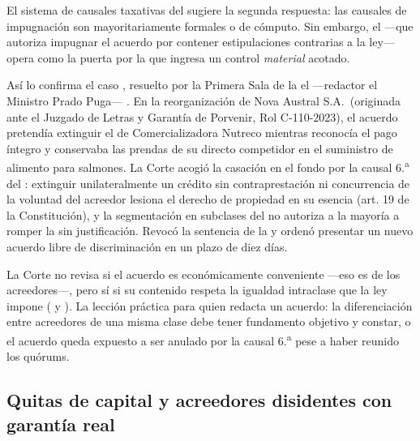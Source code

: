 El sistema de causales taxativas del  sugiere la segunda respuesta: las causales de
impugnación son mayoritariamente formales o de cómputo. Sin embargo, el 
---que autoriza impugnar el acuerdo por contener estipulaciones contrarias a la ley--- opera como
la puerta por la que ingresa un control \emph{material} acotado.

Así lo confirma el caso , resuelto por la Primera
Sala de la \csup{} el  ---redactor el Ministro Prado Puga---
\parencite{juris-cs-nova-austral}. En la reorganización de Nova Austral S.A.\ (originada ante el
Juzgado de Letras y Garantía de Porvenir, Rol C-110-2023), el acuerdo pretendía extinguir el
 de Comercializadora Nutreco mientras reconocía el
pago íntegro y conservaba las prendas de su directo competidor en el suministro de alimento para
salmones. La Corte acogió la casación en el fondo por la causal 6.\textsuperscript{a} del :
extinguir unilateralmente un crédito sin contraprestación ni concurrencia de la voluntad del
acreedor lesiona el derecho de propiedad en su esencia (art. 19  de la Constitución), y la
segmentación en subclases del  no autoriza a la mayoría a romper la  sin justificación. Revocó la sentencia de la  y ordenó presentar un
nuevo acuerdo libre de discriminación en un plazo de diez días.

\begin{foco}
La Corte no revisa si el acuerdo es económicamente conveniente ---eso es de los acreedores---, pero
sí si su contenido respeta la igualdad intraclase que la ley impone ( y ). La
lección práctica para quien redacta un acuerdo: la diferenciación entre acreedores de una misma
clase debe tener fundamento objetivo y constar, o el acuerdo queda expuesto a ser anulado por la
causal 6.\textsuperscript{a} pese a haber reunido los quórums.
\end{foco}

\subsection{Quitas de capital y acreedores disidentes con garantía real}

